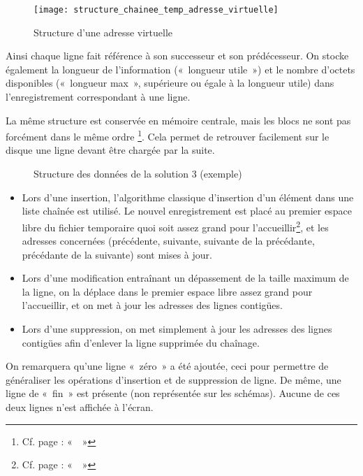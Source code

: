 \begin{figure}[H]
	\centering
	\caption{Structure d'une adresse virtuelle}
	\texttt{[image: structure\_chainee\_temp\_adresse\_virtuelle]}
\end{figure}

Ainsi chaque ligne fait référence à son successeur et son prédécesseur. On stocke également la longueur de l'information («~longueur utile~») et le nombre d'octets disponibles («~longueur max~», supérieure ou égale à la longueur utile) dans l'enregistrement correspondant à une ligne.

La même structure est conservée en mémoire centrale, mais les blocs ne sont pas forcément dans le même ordre \footnote{Cf. page \pageref{subsec:gestionblocs} : «~~»}. Cela permet de retrouver facilement sur le disque une ligne devant être chargée par la suite.

\begin{figure}[H]
	\centering
	\caption{Structure des données de la solution 3 (exemple)}
\end{figure}

\begin{itemize}
	\item Lors d'une insertion, l'algorithme classique d'insertion d'un élément dans une liste chaînée est utilisé. Le nouvel enregistrement est placé au premier espace libre du fichier temporaire quoi soit assez grand pour l'accueillir\footnote{Cf. page \pageref{subsec:gestionespacelibre} : «~~»}, et les adresses concernées (précédente, suivante, suivante de la précédante, précédante de la suivante) sont mises à jour.
	\item Lors d'une modification entraînant un dépassement de la taille maximum de la ligne, on la déplace dans le premier espace libre assez grand pour l'accueillir, et on met à jour les adresses des lignes contigües.
	\item Lors d'une suppression, on met simplement à jour les adresses des lignes contigües afin d'enlever la ligne supprimée du chaînage.
\end{itemize}

On remarquera qu'une ligne «~zéro~» a été ajoutée, ceci pour permettre de généraliser les opérations d'insertion et de suppression de ligne. De même, une ligne de «~fin~» est présente (non représentée sur les schémas). Aucune de ces deux lignes n'est affichée à l'écran.


